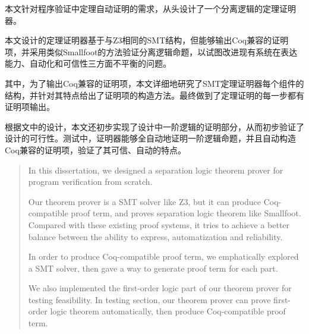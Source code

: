 \begin{cnabstract}
本文针对程序验证中定理自动证明的需求，从头设计了一个分离逻辑的定理证明器。

本文设计的定理证明器基于与Z3相同的SMT结构，但能够输出Coq兼容的证明项，并采用类似Smallfoot的方法验证分离逻辑命题，以试图改进现有系统在表达能力、自动化和可信性三方面不平衡的问题。

其中，为了输出Coq兼容的证明项，本文详细地研究了SMT定理证明器每个组件的结构，并针对其特点给出了证明项的构造方法。最终做到了定理证明的每一步都有证明项输出。

根据文中的设计，本文还初步实现了设计中一阶逻辑的证明部分，从而初步验证了设计的可行性。测试中，证明器能够全自动地证明一阶逻辑命题，并且自动构造Coq兼容的证明项，验证了其可信、自动的特点。

\end{cnabstract}

\begin{abstract}
In this dissertation, we designed a separation logic theorem prover for program verification from scratch.

Our theorem prover is a SMT solver like Z3, but it can produce Coq-compatible proof term, and proves separation logic theorem like Smallfoot. Compared with these existing proof systems, it tries to achieve a better balance between the ability to express, automatization and reliability.

In order to produce Coq-compatible proof term, we emphatically explored a SMT solver, then gave a way to generate proof term for each part.

We also implemented the first-order logic part of our theorem prover for testing feasibility. In testing section, our theorem prover can prove first-order logic theorem automatically, then produce Coq-compatible proof term.

\end{abstract}
